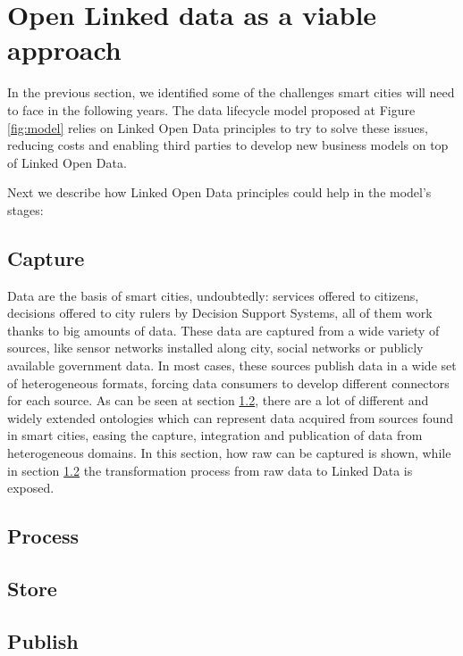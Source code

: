 \section{Open Linked data as a viable approach}

In the previous section, we identified some of the challenges smart cities will need to face in the following years. The data lifecycle model proposed at Figure \ref{fig:model} relies on Linked Open Data principles to try to solve these issues, reducing costs and enabling third parties to develop new business models on top of Linked Open Data.

Next we describe how Linked Open Data principles could help in the model's stages:

\subsection{Capture}

Data are the basis of smart cities, undoubtedly: services offered to citizens, decisions offered to city rulers by Decision Support Systems, all of them work thanks to big amounts of data. These data are captured from a wide variety of sources, like sensor networks installed along city, social networks or publicly available government data. In most cases, these sources publish data in a wide set of heterogeneous formats, forcing data consumers to develop different connectors for each source. As can be seen at section \ref{subsec:process}, there are a lot of different and widely extended ontologies which can represent data acquired from sources found in smart cities, easing the capture, integration and publication of data from heterogeneous domains. In this section, how raw can be captured is shown, while in section \ref{subsec:process} the transformation process from raw data to Linked Data is exposed. 

\subsection{Process}
\label{subsec:process}

\subsection{Store}

\subsection{Publish}

